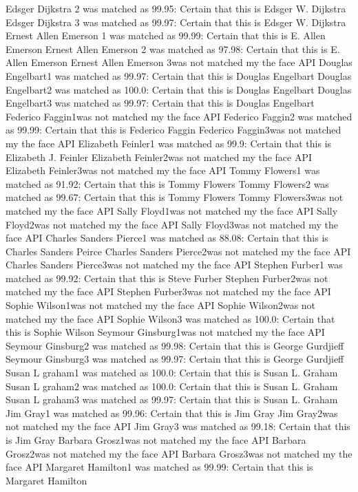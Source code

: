 \documentclass[12pt,a4paper]{article}
\begin{document}
\begin{appendices}
Edsger Dijkstra 2 was matched as 99.95: Certain that this is Edsger W. Dijkstra
Edsger Dijkstra 3 was matched as 99.97: Certain that this is Edsger W. Dijkstra
Ernest Allen Emerson 1 was matched as 99.99: Certain that this is E. Allen Emerson
Ernest Allen Emerson 2 was matched as 97.98: Certain that this is E. Allen Emerson
Ernest Allen Emerson 3was not matched my the face API
Douglas Engelbart1 was matched as 99.97: Certain that this is Douglas Engelbart
Douglas Engelbart2 was matched as 100.0: Certain that this is Douglas Engelbart
Douglas Engelbart3 was matched as 99.97: Certain that this is Douglas Engelbart
Federico Faggin1was not matched my the face API
Federico Faggin2 was matched as 99.99: Certain that this is Federico Faggin
Federico Faggin3was not matched my the face API
Elizabeth Feinler1 was matched as 99.9: Certain that this is Elizabeth J. Feinler
Elizabeth Feinler2was not matched my the face API
Elizabeth Feinler3was not matched my the face API
Tommy Flowers1 was matched as 91.92: Certain that this is Tommy Flowers
Tommy Flowers2 was matched as 99.67: Certain that this is Tommy Flowers
Tommy Flowers3was not matched my the face API
Sally Floyd1was not matched my the face API
Sally Floyd2was not matched my the face API
Sally Floyd3was not matched my the face API
Charles Sanders Pierce1 was matched as 88.08: Certain that this is Charles Sanders Peirce
Charles Sanders Pierce2was not matched my the face API
Charles Sanders Pierce3was not matched my the face API
Stephen Furber1 was matched as 99.92: Certain that this is Steve Furber
Stephen Furber2was not matched my the face API
Stephen Furber3was not matched my the face API
Sophie Wilson1was not matched my the face API
Sophie Wilson2was not matched my the face API
Sophie Wilson3 was matched as 100.0: Certain that this is Sophie Wilson
Seymour Ginsburg1was not matched my the face API
Seymour Ginsburg2 was matched as 99.98: Certain that this is George Gurdjieff
Seymour Ginsburg3 was matched as 99.97: Certain that this is George Gurdjieff
Susan L graham1 was matched as 100.0: Certain that this is Susan L. Graham
Susan L graham2 was matched as 100.0: Certain that this is Susan L. Graham
Susan L graham3 was matched as 99.97: Certain that this is Susan L. Graham
Jim Gray1 was matched as 99.96: Certain that this is Jim Gray
Jim Gray2was not matched my the face API
Jim Gray3 was matched as 99.18: Certain that this is Jim Gray
Barbara Grosz1was not matched my the face API
Barbara Grosz2was not matched my the face API
Barbara Grosz3was not matched my the face API
Margaret Hamilton1 was matched as 99.99: Certain that this is Margaret Hamilton

\end{appendices}
\end{document}
